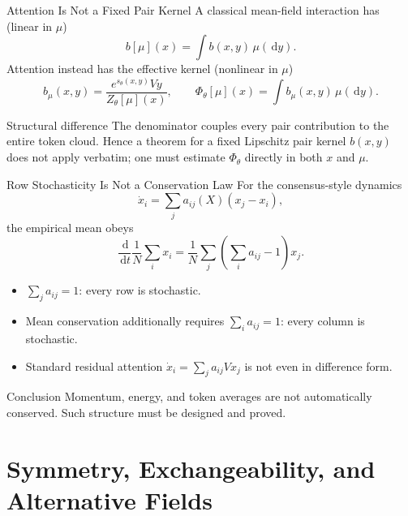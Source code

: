 \documentclass[aspectratio=169,11pt]{beamer}
\newcommand{\dd}{\,\mathrm{d}}
\begin{document}
\begin{frame}{Attention Is Not a Fixed Pair Kernel}
A classical mean-field interaction has (linear in $\mu$)
\[
 b[\mu](x)=\int b(x,y)\,\mu(\dd y).
\]
Attention instead has the effective kernel (nonlinear in $\mu$)
\[
 b_\mu(x,y)
 =\frac{e^{s_\theta(x,y)}Vy}{Z_\theta[\mu](x)},
 \qquad
 \Phi_\theta[\mu](x)=\int b_\mu(x,y)\,\mu(\dd y).
\]

\begin{block}{Structural difference}
The denominator couples every pair contribution to the entire token cloud.
Hence a theorem for a fixed Lipschitz pair kernel $b(x,y)$ does not apply verbatim; one must estimate $\Phi_\theta$ directly in both $x$ and $\mu$.
\end{block}
\end{frame}

\begin{frame}{Row Stochasticity Is Not a Conservation Law}
For the consensus-style dynamics
\[
 \dot x_i=\sum_j a_{ij}(X)(x_j-x_i),
\]
the empirical mean obeys
\[
 \frac{\dd}{\dd t}\frac1N\sum_i x_i
 =\frac1N\sum_j\left(\sum_i a_{ij}-1\right)x_j.
\]

\begin{itemize}
\item $\sum_j a_{ij}=1$: every row is stochastic.
\item Mean conservation additionally requires $\sum_i a_{ij}=1$: every column is stochastic.
\item Standard residual attention $\dot x_i=\sum_j a_{ij}Vx_j$ is not even in difference form.
\end{itemize}

\begin{alertblock}{Conclusion}
Momentum, energy, and token averages are not automatically conserved.  Such structure must be designed and proved.
\end{alertblock}
\end{frame}



\section{Symmetry, Exchangeability, and Alternative Fields}
\end{document}
